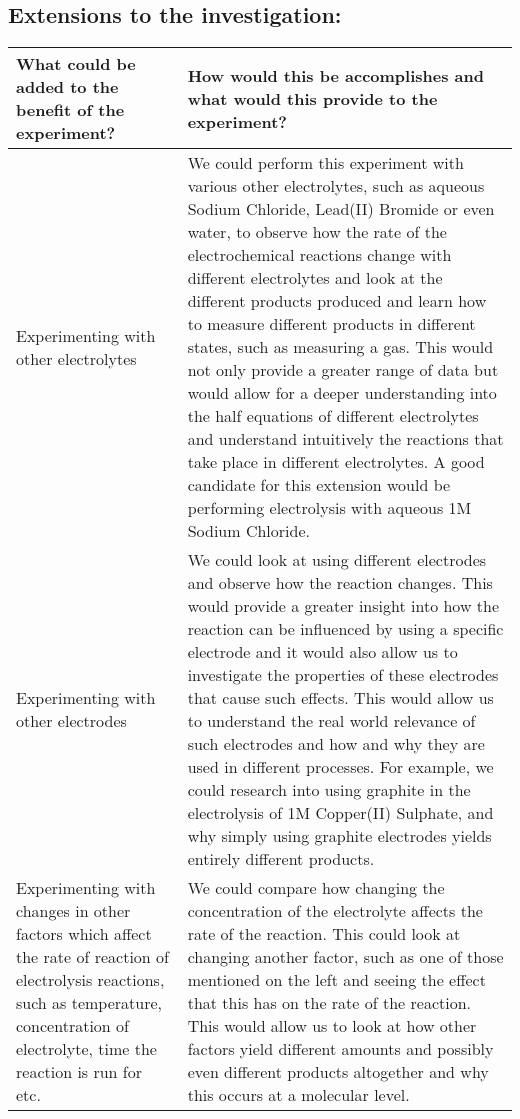 \documentclass[11pt, a4]{article}
\begin{document}
		\subsection{Extensions to the investigation:}
			\begin{small}
				\begin{longtable}{|>{\centering\arraybackslash}m{5.2cm}|>{\centering\arraybackslash}m{10cm}|}
					\hline
					\textbf{What could be added to the benefit of the experiment?} & \textbf{How would this be accomplishes and what would this provide to the experiment?}\\
					\hline
					\hline
					Experimenting with other electrolytes &
					We could perform this experiment with various other electrolytes, such as aqueous Sodium Chloride, Lead(II) Bromide or even water, to observe how the rate of the electrochemical reactions change with different electrolytes and look at the different products produced and learn how to measure different products in different states, such as measuring a gas. This would not only provide a greater range of data but would allow for a deeper understanding into the half equations of different electrolytes and understand intuitively the reactions that take place in different electrolytes. A good candidate for this extension would be performing electrolysis with aqueous 1M Sodium Chloride.\\
					\hline
					Experimenting with other electrodes &
					We could look at using different electrodes and observe how the reaction changes. This would provide a greater insight into how the reaction can be influenced by using a specific electrode and it would also allow us to investigate the properties of these electrodes that cause such effects. This would allow us to understand the real world relevance of such electrodes and how and why they are used in different processes. For example, we could research into using graphite in the electrolysis of 1M Copper(II) Sulphate, and why simply using graphite electrodes yields entirely different products.\\
					\hline
					Experimenting with changes in other factors which affect the rate of reaction of electrolysis	 reactions, such as temperature, concentration of electrolyte, time the reaction is run for etc. &
					We could compare how changing the concentration of the electrolyte affects the rate of the reaction. This could look at changing another factor, such as one of those mentioned on the left and seeing the effect that this has on the rate of the reaction. This would allow us to look at how other factors yield different amounts and possibly even different products altogether and why this occurs at a molecular level.\\

\end{longtable}
\end{small}
\end{document}
